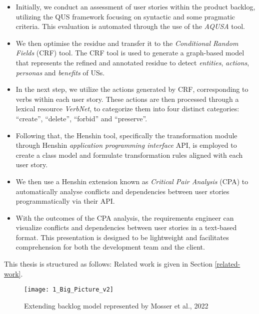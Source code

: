\begin{itemize}
\item Initially, we conduct an assessment of user stories within the product backlog, utilizing the QUS framework focusing on syntactic and some pragmatic criteria. This evaluation is automated through the use of the \emph{AQUSA} tool.
\item We then optimise the residue and transfer it to the \emph{Conditional Random Fields} (CRF) tool. The CRF tool is used to generate a graph-based model that represents the refined and annotated residue to detect \emph{entities}, \emph{actions}, \emph{personas} and \emph{benefits} of USs.
\item In the next step, we utilize the actions generated by CRF, corresponding to verbs within each user story. These actions are then processed through a lexical resource \emph{VerbNet}, to categorize them into four distinct categories: \enquote{create}, \enquote{delete}, \enquote{forbid} and \enquote{preserve}.
\item Following that, the Henshin tool, specifically the transformation module through Henshin \emph{application programming interface} API, is employed to create a class model and formulate transformation rules aligned with each user story.
\item We then use a Henshin extension known as \emph{Critical Pair Analysis} (CPA) to automatically analyse conflicts and dependencies between user stories programmatically via their API.
\item With the outcomes of the CPA analysis, the requirements engineer can visualize conflicts and dependencies between user stories in a text-based format. This presentation is designed to be lightweight and facilitates comprehension for both the development team and the client.
\end{itemize}
This thesis is structured as follows: Related work is given in Section \ref{related-work}. 



\begin{landscape}
\begin{figure}
\texttt{[image: 1\_Big\_Picture\_v2]}
\caption{Extending backlog model represented by Mosser et al., 2022\cite{mosser2022modelling}}\label{fig:workflow_diagram}
\restoregeometry
\end{figure}
\thispagestyle{empty}
\end{landscape}


